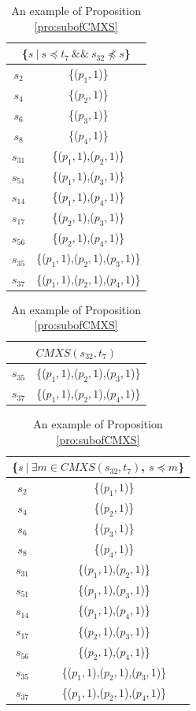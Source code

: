  \begin{table}[htbp]
  \centering
  \caption{An example of Proposition \ref{pro:subofCMXS}}
  \label{examleOfCMXSPro}
    \begin{tabular}{|c|c|} \hline
     \multicolumn{2}{|c|}{\{$s\ |\ s \preceq t_{7}\ \&\&\ s_{32} \npreceq s$\}} \\ \hline
   $s_{2}$ & \{($p_{1}, 1$)\} \\
   $s_{4}$ & \{($p_{2}, 1$)\} \\
   $s_{6}$ & \{($p_{3}, 1$)\} \\
   $s_{8}$ & \{($p_{4}, 1$)\} \\
   $s_{31}$ & \{($p_{1}, 1$),($p_{2}, 1$)\} \\

   $s_{51}$ & \{($p_{1}, 1$),($p_{3}, 1$)\} \\
   $s_{14}$ & \{($p_{1}, 1$),($p_{4}, 1$)\} \\
   $s_{17}$ & \{($p_{2}, 1$),($p_{3}, 1$)\} \\
   $s_{56}$ & \{($p_{2}, 1$),($p_{4}, 1$)\} \\

   $s_{35}$ & \{($p_{1}, 1$),($p_{2}, 1$),($p_{3}, 1$)\} \\
   $s_{37}$ & \{($p_{1}, 1$),($p_{2}, 1$),($p_{4}, 1$)\} \\   \hline
    \end{tabular}%
\quad
    \begin{tabular}{|c|c|} \hline
     \multicolumn{2}{|c|}{$CMXS(s_{32}, t_{7})$} \\ \hline
   $s_{35}$ & \{($p_{1}, 1$),($p_{2}, 1$),($p_{3}, 1$)\} \\
   $s_{37}$ & \{($p_{1}, 1$),($p_{2}, 1$),($p_{4}, 1$)\} \\ \hline
    \end{tabular}%
\quad
    \begin{tabular}{|c|c|} \hline
   \multicolumn{2}{|c|}{\{$ s\ |\ \exists m \in CMXS(s_{32}, t_{7})$, $s \preceq m$\}}\\ \hline
   $s_{2}$ & \{($p_{1}, 1$)\} \\
   $s_{4}$ & \{($p_{2}, 1$)\} \\
   $s_{6}$ & \{($p_{3}, 1$)\} \\
   $s_{8}$ & \{($p_{4}, 1$)\} \\
   $s_{31}$ & \{($p_{1}, 1$),($p_{2}, 1$)\} \\

   $s_{51}$ & \{($p_{1}, 1$),($p_{3}, 1$)\} \\
   $s_{14}$ & \{($p_{1}, 1$),($p_{4}, 1$)\} \\
   $s_{17}$ & \{($p_{2}, 1$),($p_{3}, 1$)\} \\
   $s_{56}$ & \{($p_{2}, 1$),($p_{4}, 1$)\} \\

   $s_{35}$ & \{($p_{1}, 1$),($p_{2}, 1$),($p_{3}, 1$)\} \\
   $s_{37}$ & \{($p_{1}, 1$),($p_{2}, 1$),($p_{4}, 1$)\} \\
   \hline
    \end{tabular}%
\end{table}

